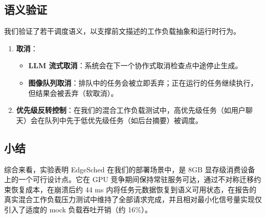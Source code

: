 \subsection{语义验证}

我们验证了若干调度语义，以支撑前文描述的工作负载抽象和运行时行为。

\begin{enumerate}
\item \textbf{取消}：
\begin{itemize}
\item \textbf{LLM 流式取消}：系统会在下一个协作式取消检查点中途停止生成。
\item \textbf{图像队列取消}：排队中的任务会被立即丢弃；正在运行的任务继续执行，但结果会被丢弃（软取消）。
\end{itemize}

\item \textbf{优先级反转控制}：在我们的混合工作负载测试中，高优先级任务（如用户聊天）会在队列中先于低优先级任务（如后台摘要）被调度。
\end{enumerate}

\subsection{小结}

综合来看，实验表明 EdgeSched 在我们的部署场景中，是 8GB 显存级消费设备上的一个可行设计点。它在 GPU 竞争期间保持常驻服务可达，通过不对称迁移约束恢复成本，在崩溃后约 44 ms 内将任务元数据恢复到语义可用状态，在报告的真实混合工作负载压力测试中维持了全部请求完成，并且相对最小化信号量实现仅引入了适度的 mock 负载吞吐开销（约 16\%）。
